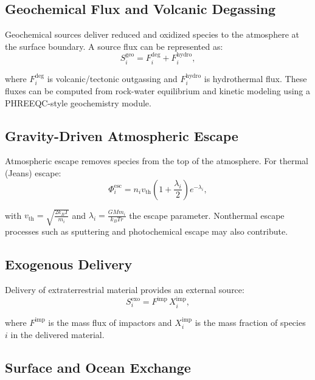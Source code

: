 \documentclass[11pt]{article}
\begin{document}
\subsection{Geochemical Flux and Volcanic Degassing}

Geochemical sources deliver reduced and oxidized species to the atmosphere at the surface boundary. A source flux can be represented as:
\begin{equation}
S_i^{\mathrm{geo}} = F_i^{\mathrm{deg}} + F_i^{\mathrm{hydro}},
\end{equation}

where $F_i^{\mathrm{deg}}$ is volcanic/tectonic outgassing and $F_i^{\mathrm{hydro}}$ is hydrothermal flux. These fluxes can be computed from rock-water equilibrium and kinetic modeling using a PHREEQC-style geochemistry module.

\subsection{Gravity-Driven Atmospheric Escape}

Atmospheric escape removes species from the top of the atmosphere. For thermal (Jeans) escape:
\begin{equation}
\Phi_i^{\mathrm{esc}} = n_i v_{\mathrm{th}} \left(1 + \frac{\lambda_i}{2}\right) e^{-\lambda_i},
\end{equation}

with $v_{\mathrm{th}} = \sqrt{\frac{2 k_B T}{m_i}}$ and $\lambda_i = \frac{G M m_i}{k_B T r}$ the escape parameter. Nonthermal escape processes such as sputtering and photochemical escape may also contribute.

\subsection{Exogenous Delivery}

Delivery of extraterrestrial material provides an external source:
\begin{equation}
S_i^{\mathrm{exo}} = F^{\mathrm{imp}} \, X_i^{\mathrm{imp}},
\end{equation}

where $F^{\mathrm{imp}}$ is the mass flux of impactors and $X_i^{\mathrm{imp}}$ is the mass fraction of species $i$ in the delivered material.

\subsection{Surface and Ocean Exchange}
\end{document}
